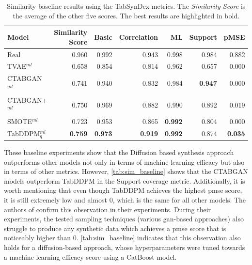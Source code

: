 \begin{table}[h]
	\centering
	\begin{tabular}{lrrrrrr}
		\toprule
		\textbf{Model}     & \textbf{Similarity Score} & \textbf{Basic} & \textbf{Correlation} & \textbf{ML}    & \textbf{Support} & \textbf{pMSE}  \\
		\midrule
		Real               & 0.960                     & 0.992          & 0.943                & 0.998          & 0.984            & 0.882          \\
		TVAE$^{ml}$        & 0.658                     & 0.854          & 0.814                & 0.962          & 0.657            & 0.000          \\
		CTABGAN$^{ml}$     & 0.741                     & 0.940          & 0.832                & 0.984          & \textbf{0.947}   & 0.000          \\
		CTABGAN+$^{ml}$    & 0.750                     & 0.969          & 0.882                & 0.990          & 0.892            & 0.019          \\
		SMOTE$^{ml}$       & 0.723                     & 0.953          & 0.865                & \textbf{0.992} & 0.804            & 0.000          \\
		TabDDPM$^{ml}_{q}$ & \textbf{0.759}            & \textbf{0.973} & \textbf{0.919}       & \textbf{0.992} & 0.874            & \textbf{0.035} \\
		\bottomrule
	\end{tabular}
	\caption[Similarity baseline]{Similarity baseline results using the TabSynDex metrics. The \textit{Similarity Score} is the average of the other five scores. The best results are highlighted in bold.}
	\label{tab:sim_baseline}
\end{table}

These baseline experiments show that the Diffusion based synthesis approach outperforms other models not only in terms of machine learning efficacy but also in terms of other metrics.
However, \autoref{tab:sim_baseline} shows that the CTABGAN models outperform TabDDPM in the Support coverage metric.
Additionally, it is worth mentioning that even though TabDDPM achieves the highest \gls{pmse} score, it is still extremely low and almost 0, which is the same for all other models.
The authors of \cite{chundawat2022UniversalMetricRobust} confirm this observation in their experiments.
During their experiments, the tested sampling techniques (various \gls{gan}-based approaches) also struggle to produce any synthetic data which achieves a \gls{pmse} score that is noticeably higher than 0.
\autoref{tab:sim_baseline} indicates that this observation also holds for a diffusion-based approach, whose hyperparameters were tuned towards a machine learning efficacy score using a CatBoost model.


